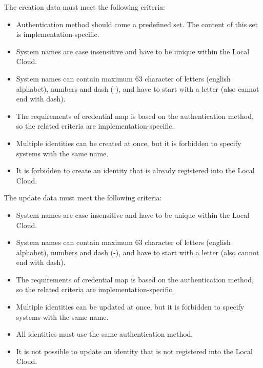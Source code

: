 \documentclass[a4paper]{arrowhead}
\begin{document}

The creation data must meet the following criteria:

\begin{itemize}
    \item Authentication method should come a predefined set. The content of this set is implementation-specific.
    \item System names are case insensitive and have to be unique within the Local Cloud.
    \item System names can contain maximum 63 character of letters (english alphabet), numbers and dash (-), and have to start with a letter (also cannot end with dash).
    \item The requirements of credential map is based on the authentication method, so the related criteria are implementation-specific.
    \item Multiple identities can be created at once, but it is forbidden to specify systems with the same name.
    \item It is forbidden to create an identity that is already registered into the Local Cloud.
\end{itemize}


The update data must meet the following criteria:

\begin{itemize}
    \item System names are case insensitive and have to be unique within the Local Cloud.
    \item System names can contain maximum 63 character of letters (english alphabet), numbers and dash (-), and have to start with a letter (also cannot end with dash).
    \item The requirements of credential map is based on the authentication method, so the related criteria are implementation-specific.
    \item Multiple identities can be updated at once, but it is forbidden to specify systems with the same name.
    \item All identities must use the same authentication method.
    \item It is not possible to update an identity that is not registered into the Local Cloud.
\end{itemize}
\end{document}
